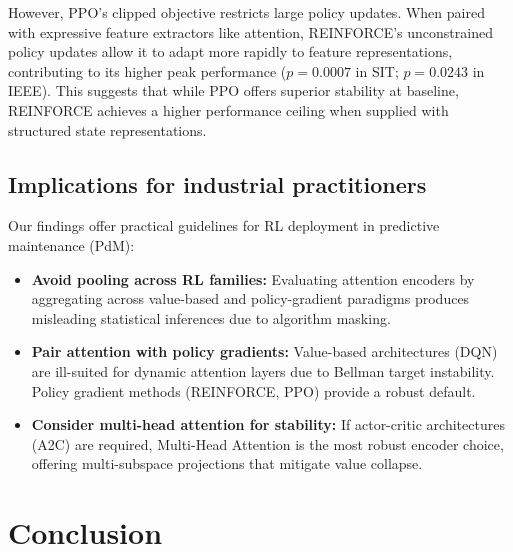 \documentclass[sn-basic]{sn-jnl}%
\begin{document}
However, \textsc{PPO}'s clipped objective restricts large policy updates. When paired with expressive feature extractors like attention, \textsc{REINFORCE}'s unconstrained policy updates allow it to adapt more rapidly to feature representations, contributing to its higher peak performance ($p = 0.0007$ in SIT; $p = 0.0243$ in IEEE). This suggests that while \textsc{PPO} offers superior stability at baseline, \textsc{REINFORCE} achieves a higher performance ceiling when supplied with structured state representations.

\subsection{Implications for industrial practitioners}
Our findings offer practical guidelines for RL deployment in predictive maintenance (PdM):
\begin{itemize}
    \item \textbf{Avoid pooling across RL families:} Evaluating attention encoders by aggregating across value-based and policy-gradient paradigms produces misleading statistical inferences due to algorithm masking.
    \item \textbf{Pair attention with policy gradients:} Value-based architectures (\textsc{DQN}) are ill-suited for dynamic attention layers due to Bellman target instability. Policy gradient methods (\textsc{REINFORCE}, \textsc{PPO}) provide a robust default.
    \item \textbf{Consider multi-head attention for stability:} If actor-critic architectures (\textsc{A2C}) are required, Multi-Head Attention is the most robust encoder choice, offering multi-subspace projections that mitigate value collapse.
\end{itemize}


\section{Conclusion} \label{sec:conclusion}
\end{document}
